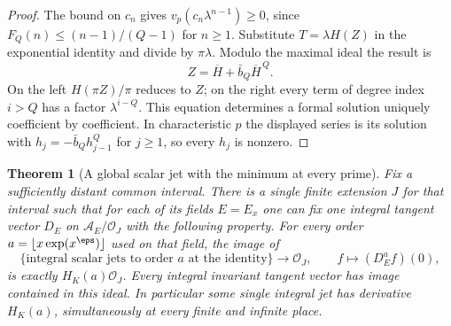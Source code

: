 \documentclass[a4paper,11pt]{article}
\newtheorem{theorem}[proposition]{Theorem}
\theoremstyle{definition}
\theoremstyle{remark}
\numberwithin{equation}{section}
\newcommand{\OO}{\mathcal O}
\begin{document}
\begin{proof}
The bound on \(c_n\) gives \(v_p(c_n\lambda^{n-1})\ge0\), since \(F_Q(n)\le(n-1)/(Q-1)\) for \(n\ge1\). Substitute \(T=\lambda H(Z)\) in the exponential identity and divide by \(\pi\lambda\). Modulo the maximal ideal the result is
\[
                Z=\overline H+\bar b_Q\overline H^{\,Q}.
\]
On the left \(H(\pi Z)/\pi\) reduces to \(Z\); on the right every term of degree index \(i>Q\) has a factor \(\lambda^{i-Q}\). This equation determines a formal solution uniquely coefficient by coefficient. In characteristic \(p\) the displayed series is its solution with \(h_j=-\bar b_Q h_{j-1}^Q\) for \(j\ge1\), so every \(h_j\) is nonzero.
\end{proof}

\begin{theorem}[A global scalar jet with the minimum at every prime]\label{thm:exact41}
Fix a sufficiently distant common interval. There is a single finite extension \(J\) for that interval such that for each of its fields \(E=E_x\) one can fix one integral tangent vector \(D_E\) on \(\mathcal A_E/\OO_J\) with the following property. For every order \(a=\lfloor x\exp(x^\eps)\rfloor\) used on that field, the image of
\[
 \{\text{integral scalar jets to order }a\text{ at the identity}\}
    \longrightarrow \OO_J,\qquad f\longmapsto (D_E^a f)(0),
\]
is exactly \(H_K(a)\OO_J\). Every integral invariant tangent vector has image contained in this ideal. In particular some single integral jet has derivative \(H_K(a)\), simultaneously at every finite and infinite place.
\end{theorem}
\end{document}
